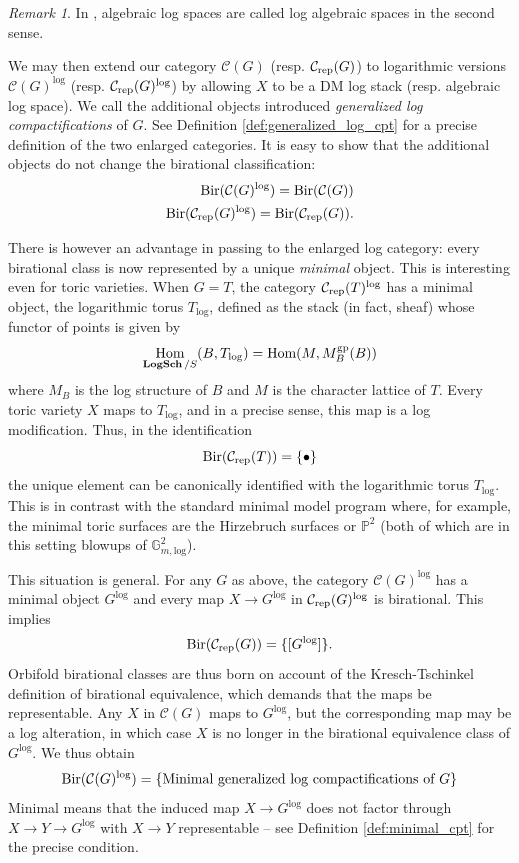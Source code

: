 \documentclass[11pt]{amsart}
\theoremstyle{definition}
\theoremstyle{remark}
\newtheorem{remark}[theorem]{Remark}
\def\log{\mathrm{log}}
\def\gp{\mathrm{gp}}
\DeclareMathOperator{\LogSch}{\mathbf{LogSch}}
\DeclareMathOperator{\Hom}{\textup{Hom}}
\begin{document}
\begin{remark}
	In \cite{LogarithmicAbeKajiwa2015}, algebraic log spaces are
	called log algebraic spaces in the second sense.
\end{remark}

We may then extend our category $\mathcal{C}(G)$ (resp.
$\mathcal{C}_{\textup{rep}}(G)$) to logarithmic versions
$\mathcal{C}(G)^{\log}$ (resp. $\mathcal{C}_{\textup{rep}}(G)^{\log}$) by
allowing $X$ to be a DM log stack (resp. algebraic log space). We call the additional objects introduced \emph{generalized log compactifications} of $G$. See Definition \ref{def:generalized_log_cpt}
for a precise definition of the two enlarged categories. It is easy to show that the additional objects do not change the birational classification:
\begin{align*}
	\textup{Bir}(\mathcal{C}(G)^{\log}) = \textup{Bir}(\mathcal{C}(G)) \\
	\textup{Bir}(\mathcal{C}_{\textup{rep}}(G)^{\log}) = \textup{Bir}(\mathcal{C}_{\textup{rep}}(G)).
\end{align*}

There is however an advantage in passing to the enlarged log category: every
birational class is now represented by a unique \emph{minimal} object. This is
interesting even for toric varieties. When $G=T$, the category
$\mathcal{C}_{\textup{rep}}(T)^{\log}$ has a minimal object, the logarithmic torus
$T_{\log}$, defined as the stack (in fact, sheaf) whose functor of points is given by
\[
\Hom_{\LogSch/S}(B,T_{\log}) = \Hom(M,M_{B}^{\gp}(B))
\]
where $M_B$ is the log structure of $B$ and $M$ is the character lattice of
$T$. Every toric variety $X$ maps to $T_{\log}$, and in a precise sense, this
map is a log modification. Thus, in the identification
\[
\textup{Bir}(\mathcal{C}_{\textup{rep}}(T))=\left\{\bullet \right\}
\]
the unique element can be canonically identified with the logarithmic torus $T_{\log}$.
This is in contrast with the standard minimal model program where, for example,
the minimal toric surfaces are the Hirzebruch surfaces or $\mathbb{P}^2$ (both
of which are in this setting blowups of $\mathbb{G}_{m,\log}^2$).

This situation is general. For any $G$ as above, the category $\mathcal{C}(G)^{\log}$
has a minimal object $G^{\log}$ and every map $X \to G^{\log}$
in $\mathcal{C}_{\textup{rep}}(G)^{\log}$ is birational. This implies
\[
\textup{Bir}(\mathcal{C}_{\textup{rep}}(G)) = \{[G^{\log}]\}.
\]
Orbifold birational classes are thus born on account of the Kresch-Tschinkel definition of
birational equivalence, which demands that the maps be representable. Any $X$ in $\mathcal{C}(G)$ maps to $G^{\log}$, but the corresponding map may be a log alteration, in which case $X$ is no longer in the birational equivalence class of $G^{\log}$. We thus
obtain
\[
\textup{Bir}(\mathcal{C}(G)^{\log}) = \{\textup{Minimal generalized log compactifications of } G\}
\]
Minimal means that the induced map $X \to G^{\log}$ does not factor through $X \to Y \to G^{\log}$ with $X \to Y$ representable --
see Definition \ref{def:minimal_cpt} for the precise condition.
\end{document}
